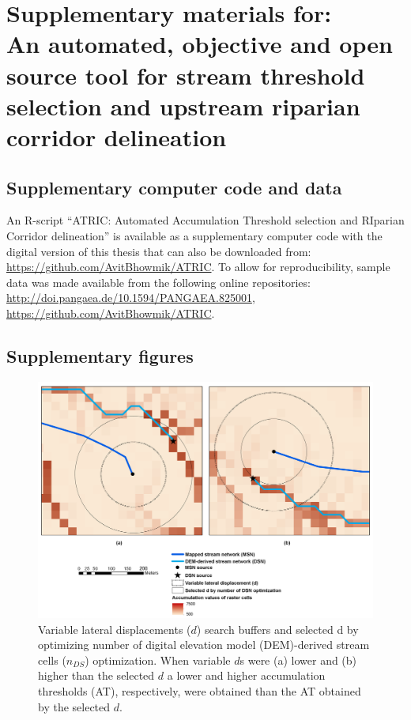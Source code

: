 \chapter{Supplementary materials for:\\An automated, objective and open source tool for stream threshold selection and upstream riparian corridor delineation}
\label{appendixA}

\section{Supplementary computer code and data}
\label{Supplementary computer code and data}

An R-script ``ATRIC: Automated Accumulation Threshold selection and RIparian Corridor delineation'' is available as a supplementary computer code with the digital version of this thesis that can also be downloaded from: \href{https://github.com/AvitBhowmik/ATRIC}{https://github.com/AvitBhowmik/ATRIC}. To allow for reproducibility, sample data was made available from the following online repositories:\\\href{http://doi.pangaea.de/10.1594/PANGAEA.825001}{http://doi.pangaea.de/10.1594/PANGAEA.825001},\\\href{https://github.com/AvitBhowmik/ATRIC}{https://github.com/AvitBhowmik/ATRIC}.

\newpage

\begin{landscape}
      
\section{Supplementary figures}
\label{Supplementary figures}

\begin{figure}[h!]
  \centering
  \includegraphics[width=0.71\linewidth]{Figures/Fig_S1_1.png}
  \caption{Variable lateral displacements ($d$) search buffers and selected d by optimizing number of digital elevation model (DEM)-derived stream cells ($n_{DS}$) optimization. When variable $d$s were (a) lower and (b) higher than the selected $d$ a lower and higher accumulation thresholds (AT), respectively, were obtained than the AT obtained by the selected $d$.}
  \label{Fig_A_1}
\end{figure}

\end{landscape}

